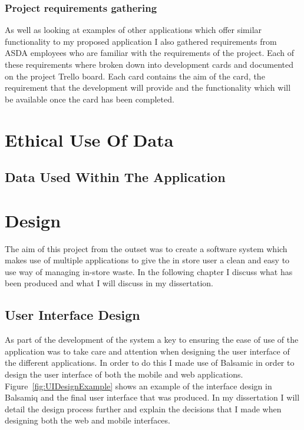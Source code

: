 \documentclass[a4paper,11pt]{report}
\begin{document}
\subsection{Project requirements gathering}

As well as looking at examples of other applications which offer similar functionality to my proposed
 application I also gathered requirements from ASDA employees who are familiar with the requirements 
 of the project. Each of these requirements where broken down into development cards and documented on
  the project Trello board. Each card contains the aim of the card, the requirement that the development
   will provide and the functionality which will be available once the card has been completed. 




\chapter{Ethical Use Of Data}
\section {Data Used Within The Application}


\chapter{Design}
The aim of this project from the outset was to create a software system which makes use of multiple applications
 to give the in store user a clean and easy to use way of managing in-store waste. In the following chapter I 
 discuss what has been produced and what I will discuss in my dissertation.

\section{User Interface Design}

As part of the development of the system a key to ensuring the ease of use of the application was to take care and attention when
designing the user interface of the different applications. In order to do this I made use of Balsamic\cite{balsamiq} in order to design the user
interface of both the mobile and web applications. Figure~\ref{fig:UIDesignExample} shows an example of the 
interface design in Balsamiq and the final user interface that was produced. 
In my dissertation I will detail the design process further and explain the decisions that I made when designing both the web and mobile interfaces.
\end{document}
